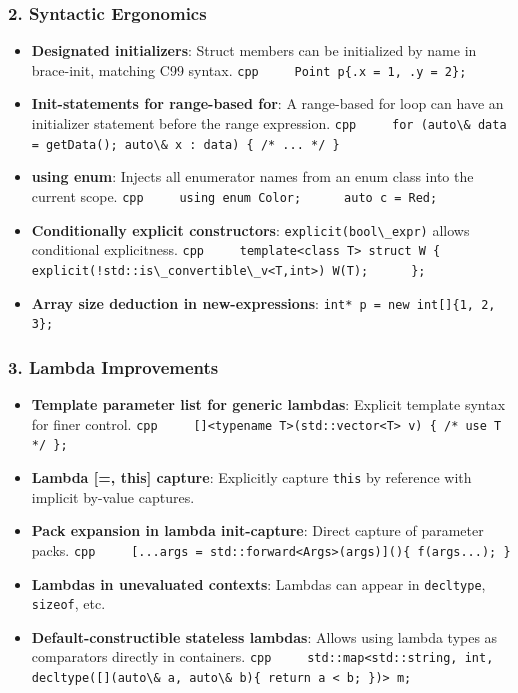 \hypertarget{syntactic-ergonomics}{%
\subsubsection{2. Syntactic Ergonomics}\label{syntactic-ergonomics}}

\begin{itemize}
\tightlist
\item
  \textbf{Designated initializers}: Struct members can be initialized by
  name in brace-init, matching C99 syntax.
  \passthrough{\lstinline!cpp     Point p\{.x = 1, .y = 2\};!}
\item
  \textbf{Init-statements for range-based for}: A range-based for loop
  can have an initializer statement before the range expression.
  \passthrough{\lstinline!cpp     for (auto\& data = getData(); auto\& x : data) \{ /* ... */ \}!}
\item
  \textbf{using enum}: Injects all enumerator names from an enum class
  into the current scope.
  \passthrough{\lstinline!cpp     using enum Color;      auto c = Red;!}
\item
  \textbf{Conditionally explicit constructors}:
  \passthrough{\lstinline!explicit(bool\_expr)!} allows conditional
  explicitness.
  \passthrough{\lstinline"cpp     template<class T> struct W \{          explicit(!std::is\_convertible\_v<T,int>) W(T);      \};"}
\item
  \textbf{Array size deduction in new-expressions}:
  \passthrough{\lstinline!int* p = new int[]\{1, 2, 3\};!}
\end{itemize}

\hypertarget{lambda-improvements}{%
\subsubsection{3. Lambda Improvements}\label{lambda-improvements}}

\begin{itemize}
\tightlist
\item
  \textbf{Template parameter list for generic lambdas}: Explicit
  template syntax for finer control.
  \passthrough{\lstinline!cpp     []<typename T>(std::vector<T> v) \{ /* use T */ \};!}
\item
  \textbf{Lambda {[}=, this{]} capture}: Explicitly capture
  \passthrough{\lstinline!this!} by reference with implicit by-value
  captures.
\item
  \textbf{Pack expansion in lambda init-capture}: Direct capture of
  parameter packs.
  \passthrough{\lstinline!cpp     [...args = std::forward<Args>(args)]()\{ f(args...); \}!}
\item
  \textbf{Lambdas in unevaluated contexts}: Lambdas can appear in
  \passthrough{\lstinline!decltype!}, \passthrough{\lstinline!sizeof!},
  etc.
\item
  \textbf{Default-constructible stateless lambdas}: Allows using lambda
  types as comparators directly in containers.
  \passthrough{\lstinline!cpp     std::map<std::string, int, decltype([](auto\& a, auto\& b)\{ return a < b; \})> m;!}
\end{itemize}

